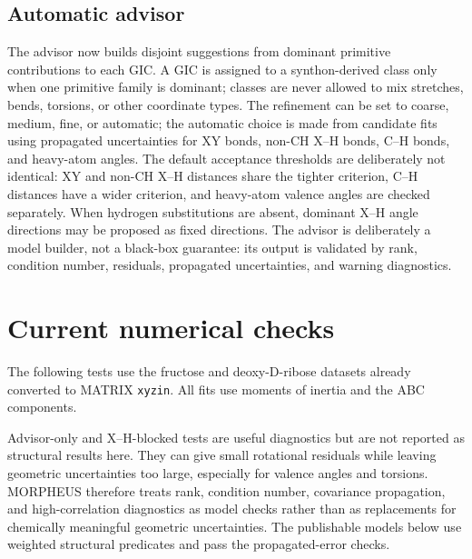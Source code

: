 \documentclass[11pt]{article}
\begin{document}
\subsection{Automatic advisor}
The advisor now builds disjoint suggestions from dominant primitive contributions to
each GIC.  A GIC is assigned to a synthon-derived class only when one primitive family
is dominant; classes are never allowed to mix stretches, bends, torsions, or other
coordinate types.  The refinement can be set to coarse, medium, fine, or automatic;
the automatic choice is made from candidate fits using propagated uncertainties for
XY bonds, non-CH X--H bonds, C--H bonds, and heavy-atom angles.  The default
acceptance thresholds are deliberately not identical: XY and non-CH X--H distances
share the tighter criterion, C--H distances have a wider criterion, and heavy-atom
valence angles are checked separately.  When hydrogen
substitutions are absent, dominant X--H angle directions may be proposed as fixed
directions.  The advisor is deliberately a model builder, not a black-box guarantee:
its output is validated by rank, condition number, residuals, propagated
uncertainties, and warning diagnostics.

\section{Current numerical checks}
The following tests use the fructose and deoxy-D-ribose datasets already converted to
MATRIX \texttt{xyzin}.  All fits use moments of inertia and the ABC components.

Advisor-only and X--H-blocked tests are useful diagnostics but are not reported as
structural results here.  They can give small rotational residuals while leaving
geometric uncertainties too large, especially for valence angles and torsions.  MORPHEUS
therefore treats rank, condition number, covariance propagation, and high-correlation
diagnostics as model checks rather than as replacements for chemically meaningful
geometric uncertainties.  The publishable models below use weighted structural
predicates and pass the propagated-error checks.

\begin{table}[h]
\centering
\caption{GIC versus Cartesian symmetry coordinates with the same predicate model
($\sigma_R=0.003$~\AA, $\sigma_A=0.3^\circ$, $\sigma_D=0.5^\circ$).}
\end{table}
\end{document}
